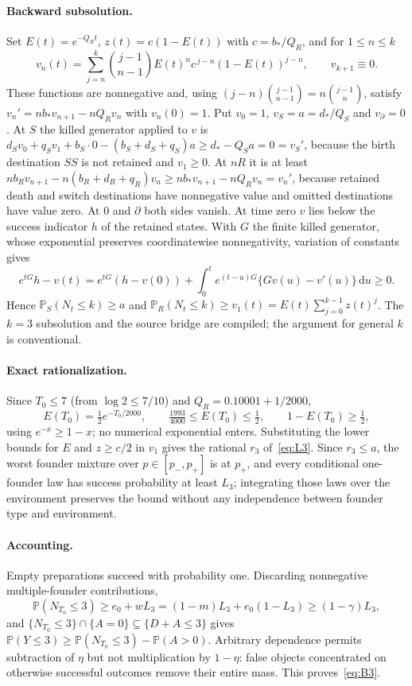 \documentclass[11pt,a4paper]{article}
\theoremstyle{plain}
\theoremstyle{definition}
\theoremstyle{remark}
\newcommand{\PP}{\mathbb P}
\newcommand{\dd}{\mathrm d}
\begin{document}
\paragraph{Backward subsolution.} Set $E(t)=e^{-Q_Rt}$, $z(t)=c(1-E(t))$ with $c=b_*/Q_R$, and for $1\le n\le k$
\begin{equation}\label{eq:vn}
v_n(t)=\sum_{j=n}^k\binom{j-1}{n-1}E(t)^nc^{\,j-n}(1-E(t))^{j-n},\qquad v_{k+1}\equiv0 .
\end{equation}
These functions are nonnegative and, using $(j-n)\binom{j-1}{n-1}=n\binom{j-1}{n}$, satisfy $v_n'=nb_*v_{n+1}-nQ_Rv_n$ with $v_n(0)=1$. Put $v_0=1$, $v_S=a=d_*/Q_S$ and $v_\partial=0$. At $S$ the killed generator applied to $v$ is $d_Sv_0+q_Sv_1+b_S\cdot0-(b_S+d_S+q_S)a\ge d_*-Q_Sa=0=v_S'$, because the birth destination $SS$ is not retained and $v_1\ge0$. At $nR$ it is at least $nb_Rv_{n+1}-n(b_R+d_R+q_R)v_n\ge nb_*v_{n+1}-nQ_Rv_n=v_n'$, because retained death and switch destinations have nonnegative value and omitted destinations have value zero. At $0$ and $\partial$ both sides vanish. At time zero $v$ lies below the success indicator $h$ of the retained states. With $G$ the finite killed generator, whose exponential preserves coordinatewise nonnegativity, variation of constants gives
\[
e^{tG}h-v(t)=e^{tG}(h-v(0))+\int_0^te^{(t-u)G}\{Gv(u)-v'(u)\}\,\dd u\ge0 .
\]
Hence $\PP_S(N_t\le k)\ge a$ and $\PP_R(N_t\le k)\ge v_1(t)=E(t)\sum_{j=0}^{k-1}z(t)^j$. The $k=3$ subsolution and the source bridge are compiled; the argument for general $k$ is conventional.

\paragraph{Exact rationalization.} Since $T_0\le7$ (from $\log2\le7/10$) and $Q_R=0.10001+1/2000$,
\begin{equation}\label{eq:E}
E(T_0)=\tfrac12e^{-T_0/2000},\qquad \tfrac{1993}{4000}\le E(T_0)\le\tfrac12,\qquad 1-E(T_0)\ge\tfrac12,
\end{equation}
using $e^{-x}\ge1-x$; no numerical exponential enters. Substituting the lower bounds for $E$ and $z\ge c/2$ in $v_1$ gives the rational $r_3$ of~\eqref{eq:L3}. Since $r_3\le a$, the worst founder mixture over $p\in[p_-,p_+]$ is at $p_+$, and every conditional one-founder law has success probability at least $L_3$; integrating those laws over the environment preserves the bound without any independence between founder type and environment.

\paragraph{Accounting.} Empty preparations succeed with probability one. Discarding nonnegative multiple-founder contributions,
\begin{equation}\label{eq:prep}
\PP(N_{T_0}\le3)\ge e_0+wL_3=(1-m)L_3+e_0(1-L_3)\ge(1-\gamma)L_3,
\end{equation}
and $\{N_{T_0}\le3\}\cap\{A=0\}\subseteq\{D+A\le3\}$ gives $\PP(Y\le3)\ge\PP(N_{T_0}\le3)-\PP(A>0)$. Arbitrary dependence permits subtraction of $\eta$ but not multiplication by $1-\eta$: false objects concentrated on otherwise successful outcomes remove their entire mass. This proves~\eqref{eq:B3}.
\end{document}
